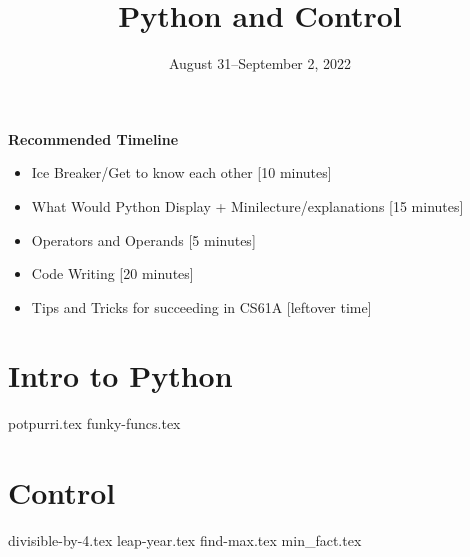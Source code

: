 \documentclass{exam}
\title{Python and Control}
\date{August 31--September 2, 2022}
\begin{document}
\maketitle
\begin{guide}
\textbf{Recommended Timeline}
\begin{itemize}
  \item Ice Breaker/Get to know each other [10 minutes]
  \item What Would Python Display + Minilecture/explanations [15 minutes]
  \item Operators and Operands [5 minutes]
  \item Code Writing [20 minutes]
  \item Tips and Tricks for succeeding in CS61A [leftover time]
\end{itemize}
\end{guide}


\section{Intro to Python}
\begin{questions}
{potpurri.tex}
{funky-funcs.tex}
\end{questions}

\section{Control}
\begin{questions}
{divisible-by-4.tex}
{leap-year.tex}
{find-max.tex}
{min_fact.tex}
\end{questions}
\end{document}
